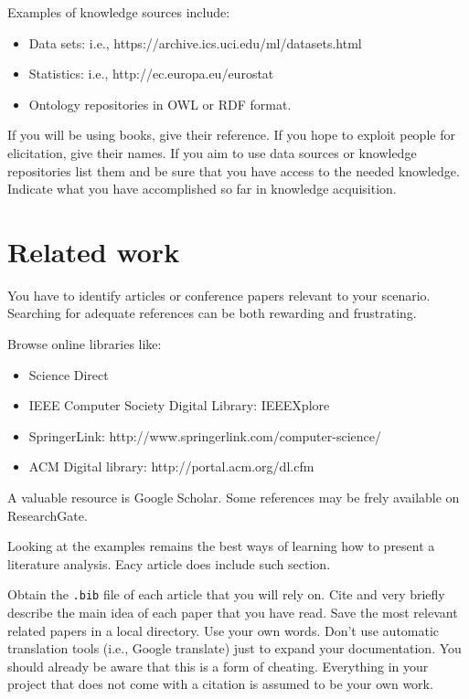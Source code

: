 \documentclass[a4paper,12pt]{report}
\begin{document}
Examples of knowledge sources include:
\begin{itemize}
\item Data sets: i.e., https://archive.ics.uci.edu/ml/datasets.html 
\item Statistics: i.e., http://ec.europa.eu/eurostat 
\item Ontology repositories in OWL or RDF format.
\end{itemize}


If you will be using books, give their reference. 
If you hope to exploit people for elicitation, give their names.
If you aim to use data sources or knowledge repositories list them and be sure that you have 
access to the needed knowledge. 
Indicate what you have accomplished so far in knowledge acquisition. 




\section{Related work}
You have to identify articles or conference papers relevant to your scenario.
Searching for adequate references can be both rewarding and frustrating.

Browse online libraries like:
\begin{itemize}
 \item Science Direct
 \item IEEE Computer Society Digital Library: IEEEXplore
 \item SpringerLink:  http://www.springerlink.com/computer-science/
 \item ACM Digital library: http://portal.acm.org/dl.cfm
\end{itemize}
A valuable resource is Google Scholar. 
Some references may be frely available on ResearchGate. 

Looking at the examples remains the best ways of learning how to present a literature analysis. 
Eacy article does include such section.


Obtain the \texttt{.bib} file of each article that you will rely on. 
Cite and very briefly describe the main idea of each paper that you have read.
Save the most relevant related papers in a local directory.
Use your own words. 
Don't use automatic translation tools (i.e., Google translate) just to expand your documentation.
You should already be aware that this is a form of cheating. 
Everything in your project that does not come with a citation is assumed to be your own work.
\end{document}
